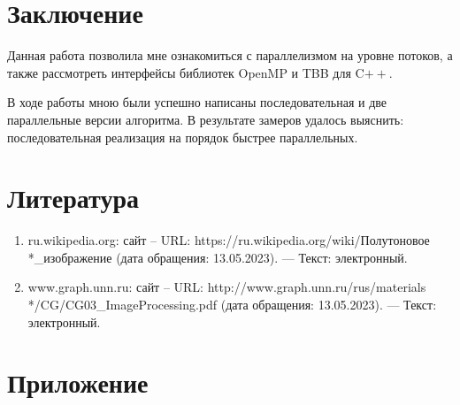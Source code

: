 \documentclass[14pt, russian]{extarticle}
\begin{document}
	\section{Заключение}
	Данная работа позволила мне ознакомиться с параллелизмом на уровне потоков, а также рассмотреть интерфейсы библиотек OpenMP и TBB для C$++$.
	
	В ходе работы мною были успешно написаны последовательная и две параллельные версии алгоритма. В результате замеров удалось выяснить: последовательная реализация на порядок быстрее параллельных.

	\newpage
	
	\section{Литература}
	\begin{enumerate}
		\item ru.wikipedia.org: сайт – URL: https://ru.wikipedia.org/wiki/Полутоновое\\*\_изображение (дата обращения: 13.05.2023). —  Текст: электронный.
		\item www.graph.unn.ru: сайт – URL: http://www.graph.unn.ru/rus/materials\\*/CG/CG03\_ImageProcessing.pdf (дата обращения: 13.05.2023). —  Текст: электронный.
	\end{enumerate}
	\newpage
	
	\section{Приложение}
	
\end{document}
